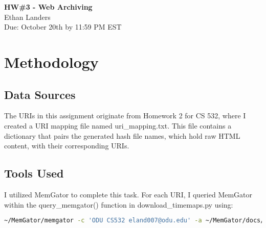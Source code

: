 \documentclass[12pt]{article}
\begin{document}
\begin{centering}
{\large\textbf{HW\#3 - Web Archiving}}\\ 
Ethan Landers\\
Due: October 20th by 11:59 PM EST\\
\end{centering}



\section*{Methodology}
\subsection*{Data Sources}
The URIs in this assignment originate from Homework 2 for CS 532, where I created a URI mapping file named uri\_mapping.txt. This file contains a dictionary that pairs the generated hash file names, which hold raw HTML content, with their corresponding URIs.

\subsection*{Tools Used}
I utilized MemGator to complete this task. For each URI, I queried MemGator within the query\_memgator() function in download\_timemaps.py using:
\begin{lstlisting}[language=bash, numbers=none]
~/MemGator/memgator -c 'ODU CS532 eland007@odu.edu' -a ~/MemGator/docs/archives.json -f JSON {uri}
\end{lstlisting}
\end{document}
